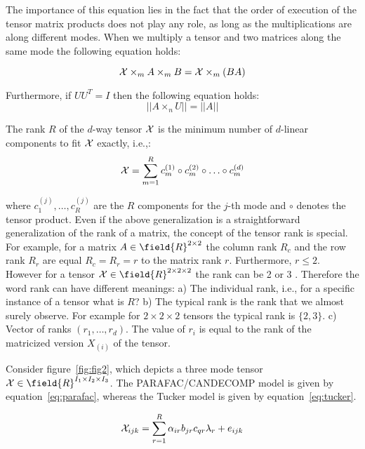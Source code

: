 The importance of this equation lies in the fact that the order of execution
of the tensor matrix products does not play any role, as long as the multiplications
are along different modes. 
When we multiply a tensor and two matrices along the same mode the following equation holds:

\begin{equation}
{\cal X} \times_m A \times_m B = {\cal X} \times_m (BA)
\label{eqb}
\end{equation}

Furthermore, if $UU^T=I$ then the following equation holds: 
\begin{equation}
|| A \times_n U ||= ||A||
\label{eq:eqa}
\end{equation}

The rank $R$ of the $d$-way tensor ${\cal X}$ is the minimum number of $d$-linear components
to fit ${\cal X}$ exactly, i.e.,: 
\begin{equation}
{\cal X} = \sum_{m=1}^R c_m^{(1)} \circ c_m^{(2)} \circ \ldots \circ c_m^{(d)} 
\end{equation}

where $c_1^{(j)},\ldots,c_R^{(j)}$ are the $R$ components for the $j$-th mode and 
$\circ$ denotes the tensor product. 
Even if the above generalization is a straightforward generalization of the rank of a matrix,
the concept of the tensor rank is special.  For example,  
for a matrix $A \in \field{R}^{2 \times 2}$ the column rank $R_c$ and the row rank $R_r$
are equal $R_c=R_r=r$ to the matrix rank $r$. Furthermore, $r \leq 2$. 
However for a tensor ${\cal X} \in \field{R}^{2 \times 2 \times 2}$ the rank can be 2 or 3 \cite{120567}.
Therefore the word rank can have different meanings:
a) The individual rank, i.e., for a specific instance of a tensor what is $R$?
b) The typical rank is the rank that we almost surely observe. For example for $2 \times 2 \times 2$
tensors the typical rank is $\{ 2,3\}$. c) Vector of ranks $(r_1,\ldots,r_d)$. The value of $r_i$
is equal to the rank of the matricized version $X_{(i)}$ of the tensor. 

Consider figure~\ref{fig:fig2}, which depicts a three mode tensor ${\cal X} \in \field{R}^{I_1 \times I_2 \times I_3}$. 
The PARAFAC/CANDECOMP model is given by equation~\ref{eq:parafac}, whereas the Tucker model is given by equation~\ref{eq:tucker}.

\begin{equation}
{\cal X}_{ijk} = \sum_{r=1}^R \alpha_{ir} b_{jr} c_{qr} \lambda_r + e_{ijk}
\label{eq:parafac}
\end{equation}

